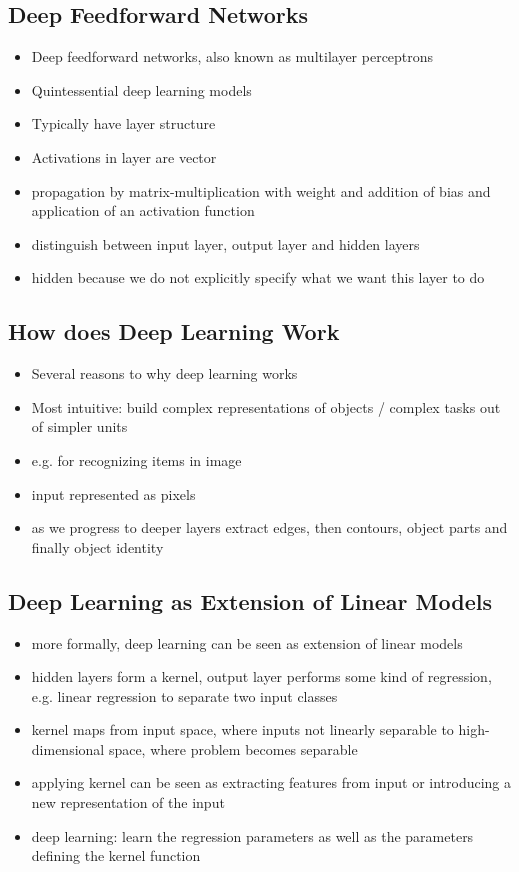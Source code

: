 \documentclass{article}
\begin{document}
\subsection*{Deep Feedforward Networks}
\begin{itemize}
    \item Deep feedforward networks, also known as multilayer perceptrons
    \item Quintessential deep learning models
    \item Typically have layer structure
    \item Activations in layer are vector
    \item propagation by matrix-multiplication with weight and addition of bias and application of an activation function
    \item distinguish between input layer, output layer and hidden layers
    \item hidden because we do not explicitly specify what we want this layer to do
\end{itemize}

\subsection*{How does Deep Learning Work}
\begin{itemize}
    \item Several reasons to why deep learning works
    \item Most intuitive: build complex representations of objects / complex tasks out of simpler units
    \item e.g. for recognizing items in image
    \item input represented as pixels
    \item as we progress to deeper layers extract edges, then contours, object parts and finally object identity
\end{itemize}

\subsection*{Deep Learning as Extension of Linear Models}
\begin{itemize}
    \item more formally, deep learning can be seen as extension of linear models
    \item hidden layers form a kernel, output layer performs some kind of regression, e.g. linear regression to separate two input classes
    \item kernel maps from input space, where inputs not linearly separable to high-dimensional space, where problem becomes separable
    \item applying kernel can be seen as extracting features from input or introducing a new representation of the input
    \item deep learning: learn the regression parameters as well as the parameters defining the kernel function
\end{itemize}
\end{document}
